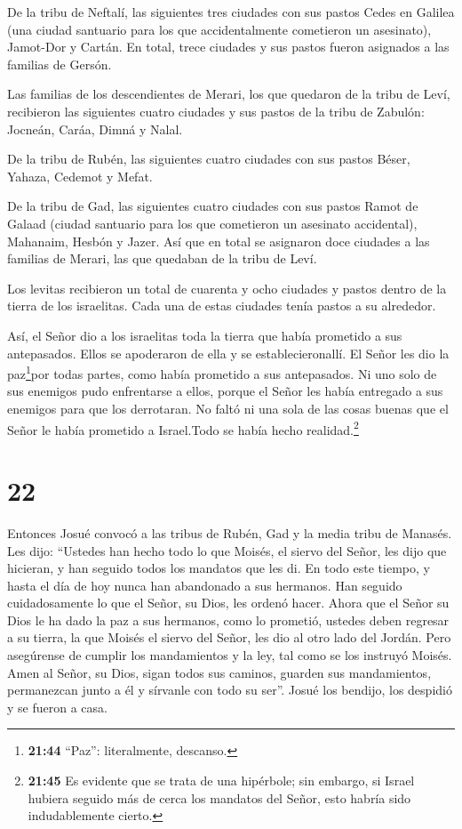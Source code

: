  De la tribu de Neftalí, las siguientes tres ciudades con
sus pastos Cedes en Galilea (una ciudad santuario para los que
accidentalmente cometieron un asesinato), Jamot-Dor y Cartán.
 En total, trece ciudades y sus pastos fueron asignados a
las familias de Gersón.

 Las familias de los descendientes de Merari, los que
quedaron de la tribu de Leví, recibieron las siguientes cuatro ciudades
y sus pastos de la tribu de Zabulón: Jocneán, Caráa,  Dimná
y Nalal.

 De la tribu de Rubén, las siguientes cuatro ciudades con
sus pastos Béser, Yahaza,  Cedemot y Mefat.

 De la tribu de Gad, las siguientes cuatro ciudades con sus
pastos Ramot de Galaad (ciudad santuario para los que cometieron un
asesinato accidental), Mahanaim,  Hesbón y Jazer.
 Así que en total se asignaron doce ciudades a las familias
de Merari, las que quedaban de la tribu de Leví.

 Los levitas recibieron un total de cuarenta y ocho
ciudades y pastos dentro de la tierra de los israelitas. 
Cada una de estas ciudades tenía pastos a su alrededor.

 Así, el Señor dio a los israelitas toda la tierra que
había prometido a sus antepasados. Ellos se apoderaron de ella y se
establecieronallí.  El Señor les dio la paz\footnote{\textbf{21:44}
  ``Paz'': literalmente, descanso.}por todas partes, como había
prometido a sus antepasados. Ni uno solo de sus enemigos pudo
enfrentarse a ellos, porque el Señor les había entregado a sus enemigos
para que los derrotaran.  No faltó ni una sola de las cosas
buenas que el Señor le había prometido a Israel.Todo se había hecho
realidad.\footnote{\textbf{21:45} Es evidente que se trata de una
  hipérbole; sin embargo, si Israel hubiera seguido más de cerca los
  mandatos del Señor, esto habría sido indudablemente cierto.}

\hypertarget{section-21}{%
\section{22}\label{section-21}}

 Entonces Josué convocó a las tribus de Rubén, Gad y la
media tribu de Manasés.  Les dijo: ``Ustedes han hecho todo
lo que Moisés, el siervo del Señor, les dijo que hicieran, y han seguido
todos los mandatos que les di.  En todo este tiempo, y hasta
el día de hoy nunca han abandonado a sus hermanos. Han seguido
cuidadosamente lo que el Señor, su Dios, les ordenó hacer. 
Ahora que el Señor su Dios le ha dado la paz a sus hermanos, como lo
prometió, ustedes deben regresar a su tierra, la que Moisés el siervo
del Señor, les dio al otro lado del Jordán.  Pero asegúrense
de cumplir los mandamientos y la ley, tal como se los instruyó Moisés.
Amen al Señor, su Dios, sigan todos sus caminos, guarden sus
mandamientos, permanezcan junto a él y sírvanle con todo su ser''.
 Josué los bendijo, los despidió y se fueron a casa.

